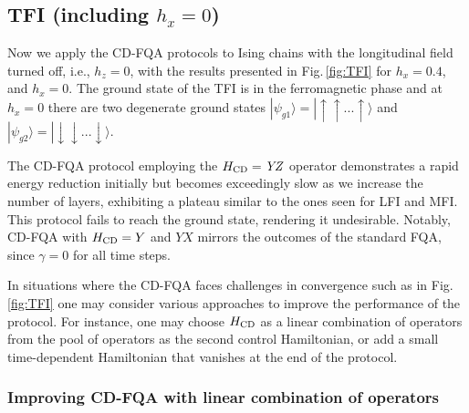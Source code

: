 \documentclass[twocolumn,aps,superscriptaddress,floatfix,longbibliography]{revtex4-2}
\newcommand{\ra}{\rangle}
\newcommand{\Fig}[1]{Fig.\,\ref{fig:#1}}
\def\YX{\ensuremath{\mathit{YX}}\xspace} %
\def\YZ{\ensuremath{\mathit{YZ}}\xspace}
\begin{document}


\subsection{TFI (including $h_x=0$)}
Now we apply the CD-FQA protocols to Ising chains with the longitudinal field turned off, i.e., $h_z=0$,
with the results presented in 
\Fig{TFI} for $h_x=0.4$, and  $h_x=0$.
The ground state of
the TFI is in the ferromagnetic phase and at $h_x=0$ there are
two degenerate ground states
$|\psi_{g1}\ra=|\uparrow\uparrow...\uparrow\ra$ and
$|\psi_{g2}\ra=|\downarrow\downarrow...\downarrow\ra$. 

The CD-FQA protocol employing the $H_{\rm CD}=\YZ$ operator
demonstrates a rapid energy reduction initially but becomes
exceedingly slow as we increase the number of layers, exhibiting
a plateau similar to the ones seen for LFI and MFI. This
protocol fails to reach the ground state, rendering it
undesirable. Notably, CD-FQA with $H_{\rm CD}=Y$ and \YX
mirrors the outcomes of the standard FQA, since $\gamma=0$ for all time steps.

In situations where the CD-FQA faces challenges in
convergence such as in \Fig{TFI} one may consider various approaches to improve the performance of the protocol. For instance, one may choose $H_{\rm CD}$ as a linear combination of operators from the pool of operators as the second control Hamiltonian, or add a small time-dependent Hamiltonian that vanishes at the end of the protocol.  


\subsubsection{Improving CD-FQA with linear combination of operators}
\end{document}
